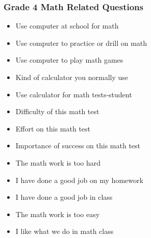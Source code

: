 \documentclass[letterpaper,12pt]{article}
\begin{document}
\begin{singlespace}
\subsubsection{Grade 4 Math Related Questions}
\begin{itemize}
	\item Use computer at school for math
	\item Use computer to practice or drill on math
	\item Use computer to play math games
	\item Kind of calculator you normally use
	\item Use calculator for math tests-student
	\item Difficulty of this math test
	\item Effort on this math test
	\item Importance of success on this math test
	\item The math work is too hard
	\item I have done a good job on my homework
	\item I have done a good job in class
	\item The math work is too easy
	\item I like what we do in math class
\end{itemize}


\end{singlespace}
\end{document}
